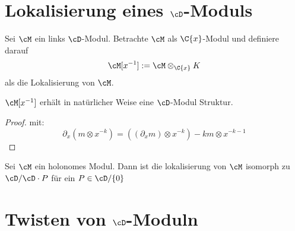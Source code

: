 \begin{comment}
\section{Lokalisierung von $\Ckx$-Moduln}
\cite[Chap 4.1.]{sabbah_cimpa90}
Sei $M$ ein $\Ckx$-Modul. Wir schreiben $M[x^{-1}]$ für den $K$-Vektor Raum
$M\otimes_{\Ckx}K$. Im allgemeinen gilt, falls $M$ von andlichen Typ über
$\Ckx$ ist, so ist $C[x^{-1}]$ von endlichem Typ über $K$. Bemerke aber, dass
$M[x^{-1}]$ generell nicht von endlichem Typ über $\Ckx$ ist.
\end{comment}

\section{Lokalisierung eines $\cD$-Moduls}
\cite[Chap 4.2.]{sabbah_cimpa90}
Sei $\cM$ ein links $\cD$-Modul. Betrachte $\cM$ als $\C\{x\}$-Modul und
definiere darauf
\[ \cM[x^{-1}]:=\cM\otimes_{\C\{x\}}K \]
als die Lokalisierung von $\cM$.
\begin{prop} \cite[Prop 4.2.1.]{sabbah_cimpa90}
$\cM[x^{-1}]$ erhält in natürlicher Weise eine $\cD$-Modul Struktur.
\end{prop}
\begin{proof} \cite[Prop 4.2.1.]{sabbah_cimpa90}
mit:
\[
\partial_x(m\otimes x^{-k})=((\partial_xm)\otimes x^{-k})-km\otimes x^{-k-1}
\]
\begin{comment}
beweis der $\cD$-linearität ist als übung gelassen
\end{comment}
\end{proof}
\begin{cor}\cite[Cor 4.2.8.]{sabbah_cimpa90}
Sei $\cM$ ein holonomes Modul. Dann ist die lokalisierung von $\cM$ isomorph zu
$\cD/\cD\cdot P$ für ein $P\in\cD/\{0\}$
\end{cor}

\section{Twisten von $\cD$-Moduln}
\cite[Chap 5 §2]{coutinho1995primer}

